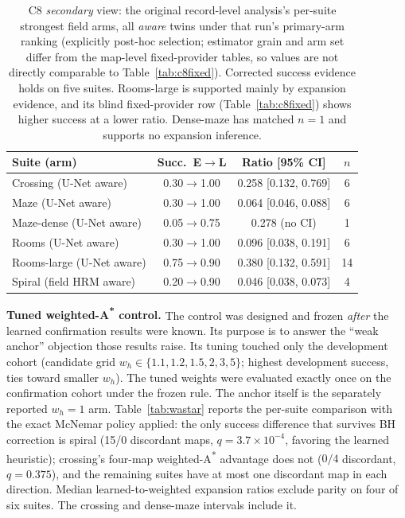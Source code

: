 \documentclass[letterpaper]{article} %
\newcommand{\stage}[1]{\textsc{#1}}
\begin{document}
\begin{table}[t]
\centering
\small
\setlength{\tabcolsep}{2.3pt}
\begin{tabular}{@{}lccc@{}}
\toprule
Suite (arm) & Succ.\ E$\to$L & Ratio [95\% CI] & $n$ \\
\midrule
Crossing (U-Net aware) & 0.30$\to$1.00 & 0.258 [0.132, 0.769] & 6 \\
Maze (U-Net aware) & 0.30$\to$1.00 & 0.064 [0.046, 0.088] & 6 \\
Maze-dense (U-Net aware) & 0.05$\to$0.75 & 0.278 (no CI) & 1 \\
Rooms (U-Net aware) & 0.30$\to$1.00 & 0.096 [0.038, 0.191] & 6 \\
Rooms-large (U-Net aware) & 0.75$\to$0.90 & 0.380 [0.132, 0.591] & 14 \\
Spiral (field HRM aware) & 0.20$\to$0.90 & 0.046 [0.038, 0.073] & 4 \\
\bottomrule
\end{tabular}
\caption{\stage{C8} \emph{secondary} view: the original record-level analysis's per-suite strongest field arms, all \emph{aware} twins under that run's primary-arm ranking (explicitly post-hoc selection; estimator grain and arm set differ from the map-level fixed-provider tables, so values are not directly comparable to Table~\ref{tab:c8fixed}). Corrected success evidence holds on five suites. Rooms-large is supported mainly by expansion evidence, and its blind fixed-provider row (Table~\ref{tab:c8fixed}) shows higher success at a lower ratio. Dense-maze has matched $n{=}1$ and supports no expansion inference.}
\label{tab:c8}
\end{table}

\textbf{Tuned weighted-A\textsuperscript{*} control.} The control was designed and frozen \emph{after} the learned confirmation results were known. Its purpose is to answer the ``weak anchor'' objection those results raise. Its tuning touched only the development cohort (candidate grid $w_h \in \{1.1, 1.2, 1.5, 2, 3, 5\}$; highest development success, ties toward smaller $w_h$). The tuned weights were evaluated exactly once on the confirmation cohort under the frozen rule. The anchor itself is the separately reported $w_h{=}1$ arm. Table~\ref{tab:wastar} reports the per-suite comparison with the exact McNemar policy applied: the only success difference that survives BH correction is spiral (15/0 discordant maps, $q{=}3.7{\times}10^{-4}$, favoring the learned heuristic); crossing's four-map weighted-A\textsuperscript{*} advantage does not ($0/4$ discordant, $q{=}0.375$), and the remaining suites have at most one discordant map in each direction. Median learned-to-weighted expansion ratios exclude parity on four of six suites. The crossing and dense-maze intervals include it.
\end{document}

